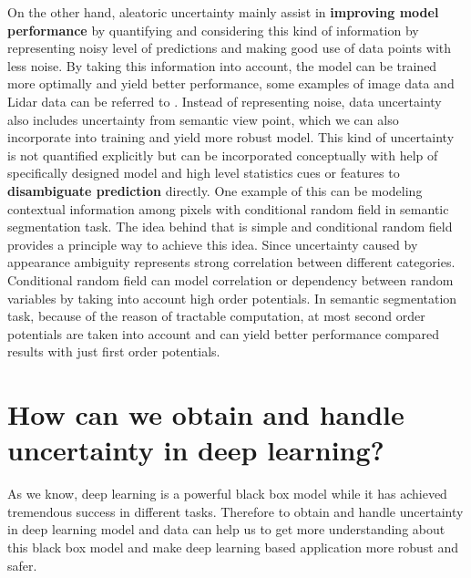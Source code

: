 On the other hand, aleatoric uncertainty mainly assist in \textbf{improving model performance} by quantifying and considering this kind of information by representing noisy level of predictions and making good use of data points with less noise. By taking this information into account, the model can be trained more optimally and yield better performance, some examples of image data and Lidar data can be referred to \cite{kendall2016modelling}\cite{feng2018towards}. Instead of representing noise, data uncertainty also includes uncertainty from semantic view point, which we can also incorporate into training and yield more robust model. This kind of uncertainty is not quantified explicitly but can be incorporated conceptually with help of specifically designed model and high level statistics cues or features to \textbf{disambiguate prediction} directly. One example of this can be modeling contextual information among pixels with conditional random field in semantic segmentation task\cite{krahenbuhl2011efficient}\cite{sutton2012introduction}\cite{lin2016efficient}. The idea behind that is simple and conditional random field provides a principle way to achieve this idea. Since uncertainty caused by appearance ambiguity represents strong correlation between different categories. Conditional random field can model correlation or dependency between random variables by taking into account high order potentials. In semantic segmentation task, because of the reason of tractable computation, at most second order potentials are taken into account and can yield better performance compared results with just first order potentials.

\newpage

\section{How can we obtain and handle uncertainty in deep learning?}
As we know, deep learning is a powerful black box model while it has achieved tremendous success in different tasks. Therefore to obtain and handle uncertainty in deep learning model and data can help us to get more understanding about this black box model and make deep learning based application more robust and safer. 

